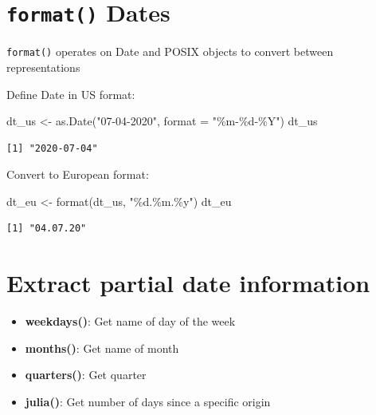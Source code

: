 \documentclass[
]{book}
\newenvironment{Shaded}{\begin{snugshade}}{\end{snugshade}}
\newcommand{\AttributeTok}[1]{\textcolor[rgb]{0.77,0.63,0.00}{#1}}
\newcommand{\FunctionTok}[1]{\textcolor[rgb]{0.00,0.00,0.00}{#1}}
\newcommand{\NormalTok}[1]{#1}
\newcommand{\OtherTok}[1]{\textcolor[rgb]{0.56,0.35,0.01}{#1}}
\newcommand{\StringTok}[1]{\textcolor[rgb]{0.31,0.60,0.02}{#1}}
\providecommand{\tightlist}{%
  \setlength{\itemsep}{0pt}\setlength{\parskip}{0pt}}
\begin{document}
\hypertarget{format-dates}{%
\section{\texorpdfstring{\texttt{format()} Dates}{format() Dates}}\label{format-dates}}

\texttt{format()} operates on Date and POSIX objects to convert between representations

Define Date in US format:

\begin{Shaded}
\begin{Highlighting}[]
\NormalTok{dt\_us }\OtherTok{\textless{}{-}} \FunctionTok{as.Date}\NormalTok{(}\StringTok{"07{-}04{-}2020"}\NormalTok{, }\AttributeTok{format =} \StringTok{"\%m{-}\%d{-}\%Y"}\NormalTok{)}
\NormalTok{dt\_us}
\end{Highlighting}
\end{Shaded}

\begin{verbatim}
[1] "2020-07-04"
\end{verbatim}

Convert to European format:

\begin{Shaded}
\begin{Highlighting}[]
\NormalTok{dt\_eu }\OtherTok{\textless{}{-}} \FunctionTok{format}\NormalTok{(dt\_us, }\StringTok{"\%d.\%m.\%y"}\NormalTok{)}
\NormalTok{dt\_eu}
\end{Highlighting}
\end{Shaded}

\begin{verbatim}
[1] "04.07.20"
\end{verbatim}

\hypertarget{extract-partial-date-information}{%
\section{Extract partial date information}\label{extract-partial-date-information}}

\begin{itemize}
\tightlist
\item
  \textbf{weekdays()}: Get name of day of the week
\item
  \textbf{months()}: Get name of month
\item
  \textbf{quarters()}: Get quarter
\item
  \textbf{julia()}: Get number of days since a specific origin
\end{itemize}
\end{document}
